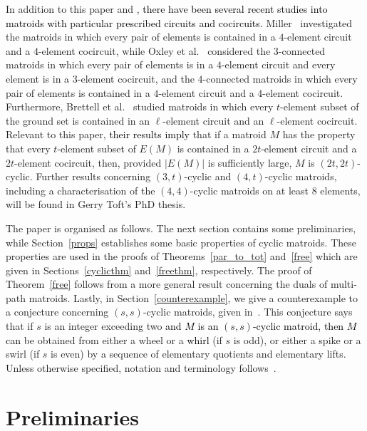 \documentclass[11pt]{amsart}
\newcommand{\blue}{\textcolor{black}}
\newcommand{\bloo}{\textcolor{black}}
\begin{document}
In addition to this paper and \cite{bre19b}, \blue{there have been several recent studies into matroids with particular prescribed circuits and cocircuits}. Miller~\cite{mil14} investigated the matroids in which every pair of elements is contained in a $4$-element circuit and a $4$-element cocircuit, while Oxley et al.~\cite{oxl19} considered the $3$-connected matroids in which every pair of elements is in a $4$-element circuit and every element is in a $3$-element cocircuit, and the $4$-connected matroids in which every pair of elements is contained in a $4$-element circuit and a $4$-element cocircuit. Furthermore, Brettell et al.~\cite{bre19a} studied matroids in which every $t$-element subset of the ground set is contained in an $\ell$-element circuit and an $\ell$-element cocircuit. Relevant to this paper, \blue{their results imply} that if a matroid $M$ has the property that every $t$-element subset of $E(M)$ is contained in a $2t$-element circuit and a $2t$-element cocircuit, then, provided $|E(M)|$ is sufficiently large, $M$ is $(2t, 2t)$-cyclic. Further results concerning $(3, t)$-cyclic and $(4, t)$-cyclic matroids, including a characterisation of the $(4, 4)$-cyclic matroids on at least $8$ elements, will be found in Gerry Toft's PhD thesis.


The paper is organised as follows. The next section contains some preliminaries, while Section~\ref{props} establishes some basic properties of cyclic matroids. These properties are used in the proofs of Theorems~\ref{par_to_tot} and~\ref{free} which are given in Sections~\ref{cyclicthm} and~\ref{freethm}, respectively. The proof of Theorem~\ref{free} follows from a more general result concerning the duals of multi-path matroids. Lastly, in Section~\ref{counterexample}, we give a counterexample to a conjecture concerning $(s, s)$-cyclic matroids, given in~\cite{bre19b}. This conjecture says that if $s$ is an integer exceeding two \blue{and $M$ is an $(s,s)$-cyclic matroid, then $M$ can} be obtained from either a wheel or a \bloo{whirl} (if $s$ is odd), or either a spike or a swirl (if $s$ is even) by a sequence of elementary quotients and elementary lifts. Unless otherwise specified, notation and terminology follows~\cite{ox11}.

\section{Preliminaries}
\label{prelims}
\end{document}

